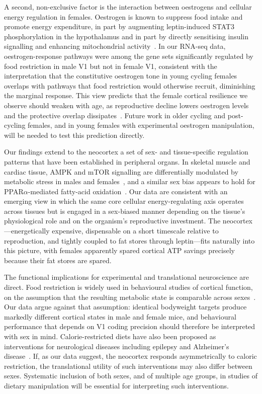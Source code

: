 \documentclass[11pt]{article}
\begin{document}
A second, non-exclusive factor is the interaction between oestrogens and cellular energy regulation in females. Oestrogen is known to suppress food intake and promote energy expenditure, in part by augmenting leptin-induced STAT3 phosphorylation in the hypothalamus and in part by directly sensitising insulin signalling and enhancing mitochondrial activity~\citep{kwon2014gpr30, nestor2014crosstalk, elsehrawy2025eralpha}. In our RNA-seq data, oestrogen-response pathways were among the gene sets significantly regulated by food restriction in male V1 but not in female V1, consistent with the interpretation that the constitutive oestrogen tone in young cycling females overlaps with pathways that food restriction would otherwise recruit, diminishing the marginal response. This view predicts that the female cortical resilience we observe should weaken with age, as reproductive decline lowers oestrogen levels and the protective overlap dissipates~\citep{greenfield2025lifespan}. Future work in older cycling and post-cycling females, and in young females with experimental oestrogen manipulation, will be needed to test this prediction directly.

Our findings extend to the neocortex a set of sex- and tissue-specific regulation patterns that have been established in peripheral organs. In skeletal muscle and cardiac tissue, AMPK and mTOR signalling are differentially modulated by metabolic stress in males and females~\citep{steinberg2023ampk, laplante2013mtorc1}, and a similar sex bias appears to hold for PPAR$\alpha$-mediated fatty-acid oxidation~\citep{lopezdominguez2016omega3}. Our data are consistent with an emerging view in which the same core cellular energy-regulating axis operates across tissues but is engaged in a sex-biased manner depending on the tissue's physiological role and on the organism's reproductive investment. The neocortex---energetically expensive, dispensable on a short timescale relative to reproduction, and tightly coupled to fat stores through leptin---fits naturally into this picture, with females apparently spared cortical ATP savings precisely because their fat stores are spared.

The functional implications for experimental and translational neuroscience are direct. Food restriction is widely used in behavioural studies of cortical function, on the assumption that the resulting metabolic state is comparable across sexes~\citep{scott2023cisplatin, heinz2021foraging}. Our data argue against that assumption: identical bodyweight targets produce markedly different cortical states in male and female mice, and behavioural performance that depends on V1 coding precision should therefore be interpreted with sex in mind. Calorie-restricted diets have also been proposed as interventions for neurological diseases including epilepsy and Alzheimer's disease~\citep{greenfield2025lifespan}. If, as our data suggest, the neocortex responds asymmetrically to caloric restriction, the translational utility of such interventions may also differ between sexes. Systematic inclusion of both sexes, and of multiple age groups, in studies of dietary manipulation will be essential for interpreting such interventions.
\end{document}
